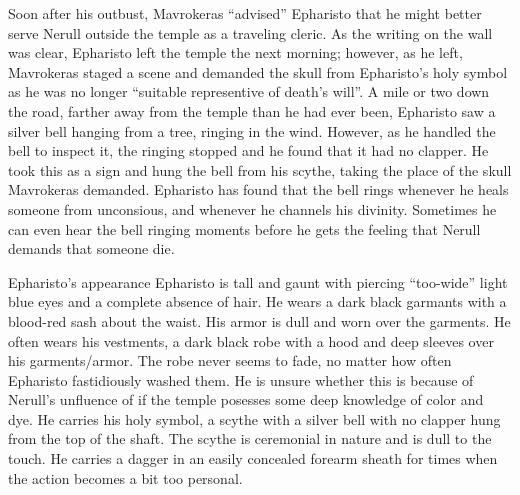 \documentclass[10pt,twoside,twocolumn,openany]{book}
\begin{document}
Soon after his outbust, Mavrokeras ``advised'' Epharisto that he might better serve Nerull outside the temple as a traveling cleric.
As the writing on the wall was clear, Epharisto left the temple the next morning; however, as he left, Mavrokeras staged a scene and demanded the skull from Epharisto's holy symbol as he was no longer ``suitable representive of death's will''.
A mile or two down the road, farther away from the temple than he had ever been, Epharisto saw a silver bell hanging from a tree, ringing in the wind.
However, as he handled the bell to inspect it, the ringing stopped and he found that it had no clapper.
He took this as a sign and hung the bell from his scythe, taking the place of the skull Mavrokeras demanded.
Epharisto has found that the bell rings whenever he heals someone from unconsious, and whenever he channels his divinity.
Sometimes he can even hear the bell ringing moments before he gets the feeling that Nerull demands that someone die.

\begin{paperbox}{Epharisto's appearance}
  Epharisto is tall and gaunt with piercing ``too-wide'' light blue eyes and a complete absence of hair.
  He wears a dark black garmants with a blood-red sash about the waist.
  His armor is dull and worn over the garments.
  He often wears his vestments, a dark black robe with a hood and deep sleeves over his garments/armor.
  The robe never seems to fade, no matter how often Epharisto fastidiously washed them.
  He is unsure whether this is because of Nerull's unfluence of if the temple posesses some deep knowledge of color and dye.
  He  carries his holy symbol, a scythe with a silver bell with no clapper hung from the top of the shaft.
  The scythe is ceremonial in nature and is dull to the touch.
  He carries a dagger in an easily concealed forearm sheath for times when the action becomes a bit too personal.


\end{paperbox}
\end{document}

